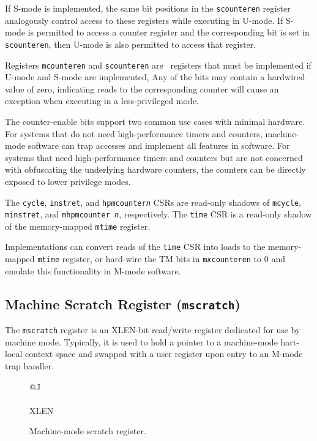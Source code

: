 If S-mode is implemented, the same bit positions in the {\tt scounteren}
register analogously control access to these registers while executing
in U-mode.  If S-mode is permitted to access a counter register and the
corresponding bit is set in {\tt scounteren}, then U-mode is also permitted
to access that register.

Registers {\tt mcounteren} and {\tt scounteren} are \warl\ registers
that must be implemented if U-mode and S-mode are implemented,
Any of the bits may contain
a hardwired value of zero, indicating reads to the corresponding counter will
cause an exception when executing in a less-privileged mode.
\begin{commentary}
The counter-enable bits support two common use cases with minimal hardware.
For systems that do not need high-performance timers and counters,
machine-mode software can trap accesses and implement all features in
software.  For systems that need high-performance timers and counters
but are not concerned with obfuscating the underlying hardware
counters, the counters can be directly exposed to lower privilege modes.
\end{commentary}

The {\tt cycle}, {\tt instret}, and {\tt hpmcounter{\em n}} CSRs are
read-only shadows of {\tt mcycle}, {\tt minstret}, and {\tt mhpmcounter{\em
n}}, respectively.  The {\tt time} CSR is a read-only shadow of the
memory-mapped {\tt mtime} register.
\begin{commentary}
Implementations can convert reads of the {\tt time} CSR into loads to
the memory-mapped {\tt mtime} register, or hard-wire the TM bits in
{\tt m{\em x}counteren} to 0
and emulate this functionality in M-mode software.
\end{commentary}

\subsection{Machine Scratch Register ({\tt mscratch})}

The {\tt mscratch} register is an XLEN-bit read/write register
dedicated for use by machine mode.  Typically, it is used to hold a
pointer to a machine-mode hart-local context space and swapped with a
user register upon entry to an M-mode trap handler.

\begin{figure}[h!]
{\footnotesize
\begin{center}
\begin{tabular}{@{}J}
 \\
\hline
{} \\
\hline
XLEN \\
\end{tabular}
\end{center}
}
\vspace{-0.1in}
\caption{Machine-mode scratch register.}
\label{mscratchreg}
\end{figure}

